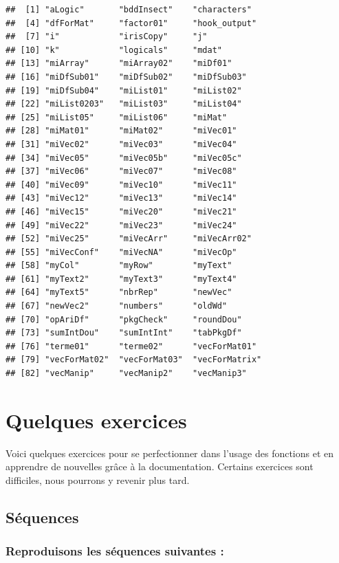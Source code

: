 \documentclass[twoside,symmetric]{book}
\begin{document}
\begin{verbatim}
##  [1] "aLogic"       "bddInsect"    "characters"  
##  [4] "dfForMat"     "factor01"     "hook_output" 
##  [7] "i"            "irisCopy"     "j"           
## [10] "k"            "logicals"     "mdat"        
## [13] "miArray"      "miArray02"    "miDf01"      
## [16] "miDfSub01"    "miDfSub02"    "miDfSub03"   
## [19] "miDfSub04"    "miList01"     "miList02"    
## [22] "miList0203"   "miList03"     "miList04"    
## [25] "miList05"     "miList06"     "miMat"       
## [28] "miMat01"      "miMat02"      "miVec01"     
## [31] "miVec02"      "miVec03"      "miVec04"     
## [34] "miVec05"      "miVec05b"     "miVec05c"    
## [37] "miVec06"      "miVec07"      "miVec08"     
## [40] "miVec09"      "miVec10"      "miVec11"     
## [43] "miVec12"      "miVec13"      "miVec14"     
## [46] "miVec15"      "miVec20"      "miVec21"     
## [49] "miVec22"      "miVec23"      "miVec24"     
## [52] "miVec25"      "miVecArr"     "miVecArr02"  
## [55] "miVecConf"    "miVecNA"      "miVecOp"     
## [58] "myCol"        "myRow"        "myText"      
## [61] "myText2"      "myText3"      "myText4"     
## [64] "myText5"      "nbrRep"       "newVec"      
## [67] "newVec2"      "numbers"      "oldWd"       
## [70] "opAriDf"      "pkgCheck"     "roundDou"    
## [73] "sumIntDou"    "sumIntInt"    "tabPkgDf"    
## [76] "terme01"      "terme02"      "vecForMat01" 
## [79] "vecForMat02"  "vecForMat03"  "vecForMatrix"
## [82] "vecManip"     "vecManip2"    "vecManip3"
\end{verbatim}

\hypertarget{quelques-exercices}{%
\section{Quelques exercices}\label{quelques-exercices}}

Voici quelques exercices pour se perfectionner dans l'usage des fonctions et en apprendre de nouvelles grâce à la documentation. Certains exercices sont difficiles, nous pourrons y revenir plus tard.

\hypertarget{suxe9quences}{%
\subsection{Séquences}\label{suxe9quences}}

\hypertarget{reproduisons-les-suxe9quences-suivantes}{%
\subsubsection{Reproduisons les séquences suivantes :}\label{reproduisons-les-suxe9quences-suivantes}}
\end{document}
